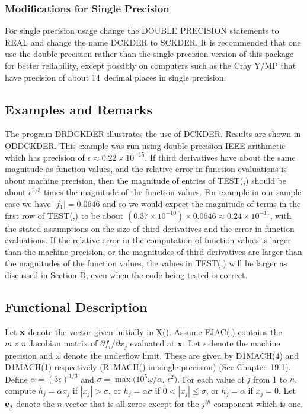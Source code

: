 \documentclass[twoside]{MATH77}
\begin{document}
\subsubsection{Modifications for Single Precision}

For single precision usage change the DOUBLE PRECISION statements to REAL
and change the name DCKDER to SCKDER. It is recommended that one use the
double precision rather than the single precision version of this package
for better reliability, except possibly on computers such as the Cray Y/MP
that have precision of about 14~decimal places in single precision.

\subsection{Examples and Remarks}

The program DRDCKDER illustrates the use of DCKDER. Results are shown in
ODDCKDER. This example was run using double precision IEEE arithmetic which
has precision of $\epsilon \approx 0.22 \times 10^{-15}$. If third derivatives
have about the same magnitude as function values, and the relative error in
function evaluations is about machine precision, then the magnitude of
entries of TEST(,) should be about $\epsilon ^{2/3}$ times the magnitude
of the function values. For example in our sample case we have $|f_1| =
0.0646$ and so we would expect the magnitude of terms in the first row of
TEST(,) to be about $(0.37 \times 10^{-10}) \times 0.0646 \approx 0.24 \times
10^{-11}$, with the stated assumptions on the size of third derivatives and
the error in function evaluations. If the relative error in the computation
of function values is larger than the machine precision, or the magnitudes
of third derivatives are larger than the magnitudes of the function values,
the values in TEST(,) will be larger as discussed in Section D, even when
the code being tested is correct.

\subsection{Functional Description}

Let ${\bf x}$ denote the vector given initially in X(). Assume FJAC(,)
contains the $m \times n$ Jacobian matrix of $\partial f_i / \partial x_j$
evaluated at ${\bf x}$. Let $\epsilon $ denote the
machine precision and $\omega $ denote the underflow limit. These are given
by D1MACH(4) and D1MACH(1) respectively (R1MACH() in single precision)
(See Chapter~19.1).
Define $\alpha = (3\epsilon )^{1/3}$ and $\sigma = \max (10^5\omega
/\alpha $, $\epsilon ^2)$. For each value of $j$ from 1 to $n$, compute $%
h_j = \alpha x_j$ if $|x_j| > \sigma $, or $h_j = \alpha \sigma $ if $0 <
|x_j| \leq \sigma $, or $h_j = \alpha $ if $x_j = 0$. Let ${\bf e}_j$
denote the $n$-vector that is all zeros except for the $j^{th}$ component
which is one.
\end{document}
